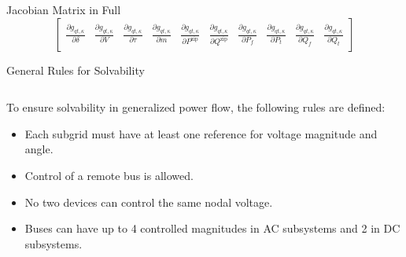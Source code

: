 \begin{frame}{Jacobian Matrix in Full}
\[\begin{bmatrix}
        \frac{\partial g_{qt, \kappa }}{\partial \delta} & \frac{\partial g_{qt, \kappa }}{\partial V} & \frac{\partial g_{qt, \kappa }}{\partial \tau} & \frac{\partial g_{qt, \kappa }}{\partial m} & \frac{\partial g_{qt, \kappa }}{\partial P^\text{zip}} & \frac{\partial g_{qt, \kappa }}{\partial Q^\text{zip}} & \frac{\partial g_{qt, \kappa }}{\partial P_f} & \frac{\partial g_{qt, \kappa }}{\partial P_t} & \frac{\partial g_{qt, \kappa }}{\partial Q_f} & \frac{\partial g_{qt, \kappa }}{\partial Q_t}
    \end{bmatrix}
    \]
\end{frame}




\begin{frame}{General Rules for Solvability}
    \begin{columns}
        \begin{column}{0.5\textwidth}
            To ensure solvability in generalized power flow, the following rules are defined:
            \begin{itemize}
                \item Each subgrid must have at least one reference for voltage magnitude and angle.
                \item Control of a remote bus is allowed.
                \item No two devices can control the same nodal voltage.
                \item Buses can have up to 4 controlled magnitudes in AC subsystems and 2 in DC subsystems.
            \end{itemize}
        \end{column}
        

\end{columns}
\end{frame}
